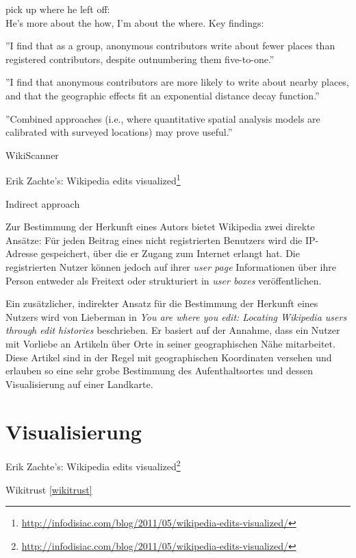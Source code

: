 
\begin{todos}
    \item pick up where he left off:  
    \\ He's more about the how, I'm about the where. Key findings:
    \item ''I find that as a group, anonymous contributors write about fewer places than registered contributors, despite outnumbering them five-to-one.'' \cite{hardy2011volunteered}
    \item ''I find that anonymous contributors are more likely to write about
nearby places, and that the geographic effects fit an exponential distance decay
function.'' \cite{hardy2011volunteered}
    \item ''Combined approaches (i.e., where quantitative spatial analysis models
are calibrated with surveyed locations) may prove useful.''  \cite[p. 85]{hardy2011volunteered}
    \item WikiScanner
    \item Erik Zachte's: Wikipedia edits visualized\footnote{\url{http://infodisiac.com/blog/2011/05/wikipedia-edits-visualized/}}
    \item Indirect approach 
\end{todos}

Zur Bestimmung der Herkunft eines Autors bietet Wikipedia zwei direkte Ansätze: 
Für jeden Beitrag eines nicht registrierten Benutzers wird die IP-Adresse gespeichert, über die er Zugang zum Internet erlangt hat. 
Die registrierten Nutzer können jedoch auf ihrer \emph{user page} Informationen über ihre Person entweder als Freitext oder strukturiert in \emph{user boxes} veröffentlichen.

Ein zusätzlicher, indirekter Ansatz für die Bestimmung der Herkunft eines Nutzers wird von Lieberman in \emph{You are where you edit: Locating Wikipedia users through edit histories}\cite{lieberman2009you} beschrieben.
Er basiert auf der Annahme, dass ein Nutzer mit Vorliebe an Artikeln über Orte in seiner geographischen Nähe mitarbeitet. 
Diese Artikel sind in der Regel mit geographischen Koordinaten versehen und erlauben so eine sehr grobe Bestimmung des Aufenthaltsortes und dessen Visualisierung auf einer Landkarte.


\section{Visualisierung}\label{sec:visualization}


\begin{todos}
    \item Erik Zachte's: Wikipedia edits visualized\footnote{\url{http://infodisiac.com/blog/2011/05/wikipedia-edits-visualized/}}
    \item Wikitrust \ref{wikitrust}
\end{todos}
